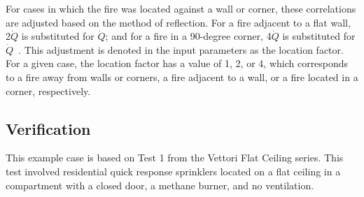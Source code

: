 For cases in which the fire was located against a wall or corner, these correlations are adjusted based on the method of reflection. For a fire adjacent to a flat wall, 2$\dot Q$ is substituted for $\dot Q$; and for a fire in a 90-degree corner, 4$\dot Q$ is substituted for $\dot Q$~\cite{SFPE:Alpert}. This adjustment is denoted in the input parameters as the location factor. For a given case, the location factor has a value of 1, 2, or 4, which corresponds to a fire away from walls or corners, a fire adjacent to a wall, or a fire located in a corner, respectively.


\clearpage


\subsection*{Verification}

This example case is based on Test 1 from the Vettori Flat Ceiling series. This test involved residential quick response sprinklers located on a flat ceiling in a compartment with a closed door, a methane burner, and no ventilation.

